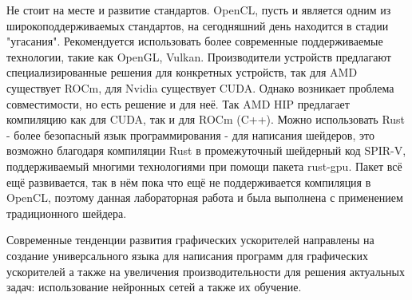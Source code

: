 \documentclass[a4paper,14pt]{extarticle}
\begin{document}
Не стоит на месте и развитие стандартов. OpenCL, пусть и является одним из
широкоподдерживаемых стандартов, на сегодняшний день находится в стадии "угасания". 
Рекомендуется использовать более современные поддерживаемые технологии, такие как OpenGL, Vulkan. 
Производители устройств предлагают специализированные решения для конкретных устройств, 
так для AMD существует ROCm, для Nvidia существует CUDA. Однако возникает проблема 
совместимости, но есть решение и для неё. Так AMD HIP предлагает компиляцию как для 
CUDA, так и для ROCm (C++). Можно использовать Rust - более безопасный язык программирования -
для написания шейдеров, это возможно благодаря компиляции Rust в промежуточный шейдерный код SPIR-V, 
поддерживаемый многими технологиями при помощи пакета rust-gpu. Пакет всё ещё развивается, 
так в нём пока что ещё не поддерживается компиляция в OpenCL, поэтому данная лабораторная
работа и была выполнена с применением традиционного шейдера.

Современные тенденции развития графических ускорителей направлены на создание
универсального языка для написания программ для графических ускорителей а 
также на увеличения производительности для решения актуальных задач: использование
нейронных сетей а также их обучение. 
\end{document}

